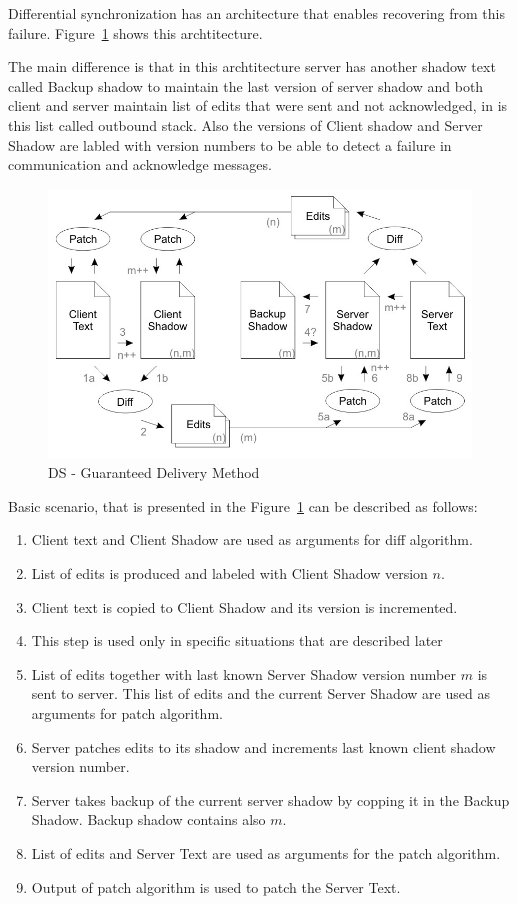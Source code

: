 \documentclass[12pt,oneside]{fithesis2}
\begin{document}
\par Differential synchronization has an architecture that enables recovering from this failure. Figure~\ref{fig:ds2} shows this archtitecture.
\par The main difference is that in this archtitecture server has another shadow text called Backup shadow to maintain the last version of server shadow and both client and server maintain list of edits that were sent and not acknowledged, in \cite{Fraser} is this list called outbound stack. Also the versions of Client shadow and Server Shadow are labled with version numbers to be able to detect a failure in communication and acknowledge messages.
\begin{figure}[H]
\caption{DS - Guaranteed Delivery Method \cite{Fraser}}
\label{fig:ds2}
\centering
\vspace{5mm}
\includegraphics{diff2}
\end{figure}
\par Basic scenario, that is presented in the Figure~\ref{fig:ds2} can be described as follows:
\begin{enumerate}
\item Client text and Client Shadow are used as arguments for diff algorithm.
\item List of edits is produced and labeled with Client Shadow version \(n\).
\item Client text is copied to Client Shadow and its version is incremented.
\item This step is used only in specific situations that are described later
\item List of edits together with last known Server Shadow version number \(m\) is sent to server. This list of edits and the current Server Shadow are used as arguments for patch algorithm. 
\item Server patches edits to its shadow and increments last known client shadow version number.
\item Server takes backup of the current server shadow by copping it in the Backup Shadow. Backup shadow contains also \(m\).
\item List of edits and Server Text are used as arguments for the patch algorithm.
\item Output of patch algorithm is used to patch the Server Text.
\end{enumerate}
\end{document}

